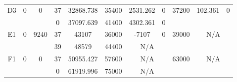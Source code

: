 \begin{sidewaystable}
\begin{tabular}{c||c|c||c|c|c|c|c||c|c|c}
         &
        
      \\
      \hline
      \multirow{2}{*}{D3} &
      \multirow{2}{*}{0} &
      \multirow{2}{*}{0} &
      37 &
      32868.738 &
      35400 &
        2531.262 &
        0 &
      \multirow{2}{*}{37200} &
        \multirow{2}{*}{102.361} &
        \multirow{2}{*}{0}
      \\
      \cline{4-8}
       &
       &
       &
      0 &
      37097.639 &
      41400 &
        4302.361 &
        0 &
      
         &
        
      \\
      \hline
      \multirow{2}{*}{E1} &
      \multirow{2}{*}{0} &
      \multirow{2}{*}{9240} &
      37 &
      43107 &
      36000 &
        -7107 &
        0 &
      \multirow{2}{*}{39000} &
        \multicolumn{2}{c}{\multirow{2}{*}{N/A}}
      \\
      \cline{4-8}
       &
       &
       &
      39 &
      48579 &
      44400 &
        \multicolumn{2}{|c||}{N/A} &
      
        
      \\
      \hline
      \multirow{2}{*}{F1} &
      \multirow{2}{*}{0} &
      \multirow{2}{*}{0} &
      37 &
      50955.427 &
      57600 &
        \multicolumn{2}{|c||}{N/A} &
      \multirow{2}{*}{63000} &
        \multicolumn{2}{c}{\multirow{2}{*}{N/A}}
      \\
      \cline{4-8}
       &
       &
       &
      0 &
      61919.996 &
      75000 &
        \multicolumn{2}{|c||}{N/A} &
      
        
      \\
\end{tabular}
\label{table:RDS1.txt-1280.tex} 
\end{sidewaystable}